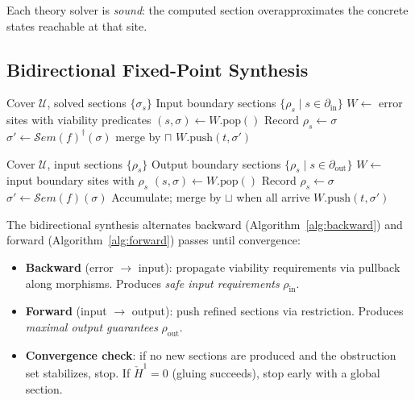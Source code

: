 \documentclass[acmsmall,screen,review,anonymous]{acmart}
\theoremstyle{remark}
\newcommand{\Sem}{\mathcal{S}\mathit{em}}
\newcommand{\Hc}[1]{\check{H}^{#1}}
\begin{document}
Each theory solver is \emph{sound}: the computed section
overapproximates the concrete states reachable at that site.

\subsection{Bidirectional Fixed-Point Synthesis}\label{sec:synthesis}

\begin{algorithm}[t]
\caption{Backward safe-input synthesis}
\label{alg:backward}
\begin{algorithmic}[1]
\Require Cover $\mathcal{U}$, solved sections $\{\sigma_s\}$
\Ensure Input boundary sections $\{\rho_s \mid s \in \partial_{\mathrm{in}}\}$
\State $W \gets$ error sites with viability predicates
  \State $(s, \sigma) \gets W.\text{pop}()$
    \State Record $\rho_s \gets \sigma$
  \Else
      \State $\sigma' \gets \Sem(f)^{\dagger}(\sigma)$
       merge by $\sqcap$
      \EndIf
      \State $W.\text{push}(t, \sigma')$
    \EndFor
  \EndIf
\EndWhile
\end{algorithmic}
\end{algorithm}

\begin{algorithm}[t]
\caption{Forward output synthesis}
\label{alg:forward}
\begin{algorithmic}[1]
\Require Cover $\mathcal{U}$, input sections $\{\rho_s\}$
\Ensure Output boundary sections $\{\rho_s \mid s \in \partial_{\mathrm{out}}\}$
\State $W \gets$ input boundary sites with $\rho_s$
  \State $(s, \sigma) \gets W.\text{pop}()$
    \State Record $\rho_s \gets \sigma$
  \EndIf
    \State $\sigma' \gets \Sem(f)(\sigma)$ 
      \State Accumulate; merge by $\sqcup$ when all arrive
    \Else
      \State $W.\text{push}(t, \sigma')$
    \EndIf
  \EndFor
\EndWhile
\end{algorithmic}
\end{algorithm}

The bidirectional synthesis alternates backward (Algorithm~\ref{alg:backward})
and forward (Algorithm~\ref{alg:forward}) passes until convergence:

\begin{itemize}[nosep]
  \item \textbf{Backward} (error $\to$ input): propagate viability
    requirements via pullback along morphisms.  Produces \emph{safe
    input requirements} $\rho_{\mathrm{in}}$.
  \item \textbf{Forward} (input $\to$ output): push refined sections
    via restriction.  Produces \emph{maximal output guarantees}
    $\rho_{\mathrm{out}}$.
  \item \textbf{Convergence check}: if no new sections are produced
    and the obstruction set stabilizes, stop.  If $\Hc{1} = 0$
    (gluing succeeds), stop early with a global section.
\end{itemize}
\end{document}

